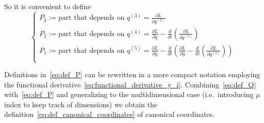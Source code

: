 So it is convenient to define
\begin{equation}\label{eq:def_P}
  \begin{cases}
    P_3 := \text{part that depends on } q^{(3)}
         = \frac{\partial L}{\partial q^{(3)}} \\
    P_2 := \text{part that depends on } q^{(4)}
         = \frac{\partial L}{\partial \ddot{q}} -
           \frac{d}{dt} \left(
             \frac{\partial L}{\partial q^{(3)}}
           \right) \\
    P_1 := \text{part that depends on } q^{(5)}
         = \frac{\partial L}{\partial \dot{q}} -
           \frac{d}{dt} \left(
             \frac{\partial L}{\partial \ddot{q}} -
             \frac{d}{dt} \left(
               \frac{\partial L}{\partial q^{(3)}}
              \right)
            \right) \\
  \end{cases}
\end{equation}

Definitions in~\eqref{eq:def_P} can be rewritten in a more compact notation
employing the functional derivative~\eqref{eq:functional_derivative_y_i}.
Combining~\eqref{eq:def_Q} with~\eqref{eq:def_P} and generalizing to the
multidimensional case (i.e.\ introducing $\mu$ index to keep track of
dimensions) we obtain the definition~\eqref{eq:def_canonical_coordinates} of
canonical coordinates.
